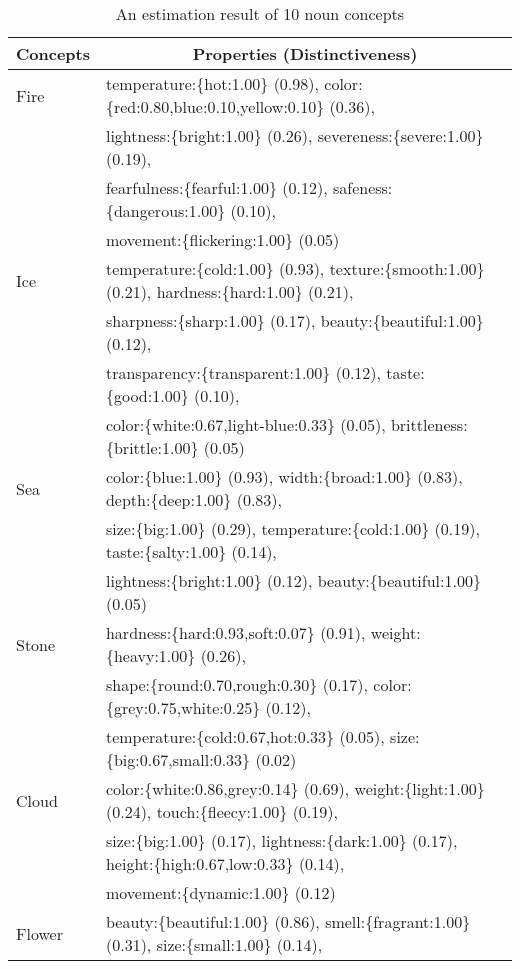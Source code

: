 \begin{table}[t]
  \caption{An estimation result of 10 noun concepts}
  \label{tbl:concepts}
  \footnotesize
  \begin{tabular}{l@{}l} \hline
    Concepts & \multicolumn{1}{c}{Properties (Distinctiveness)}\\ \hline
    Fire & temperature:\{hot:1.00\} (0.98), color:\{red:0.80,blue:0.10,yellow:0.10\} (0.36),\\
    & lightness:\{bright:1.00\} (0.26), severeness:\{severe:1.00\} (0.19),\\
    & fearfulness:\{fearful:1.00\} (0.12), safeness:\{dangerous:1.00\} (0.10),\\
    & movement:\{flickering:1.00\} (0.05)\\
    Ice & temperature:\{cold:1.00\} (0.93), texture:\{smooth:1.00\} (0.21),
    hardness:\{hard:1.00\} (0.21),\\
    & sharpness:\{sharp:1.00\} (0.17), beauty:\{beautiful:1.00\} (0.12), \\
    & transparency:\{transparent:1.00\} (0.12), taste:\{good:1.00\} (0.10), \\
    & color:\{white:0.67,light-blue:0.33\} (0.05), brittleness:\{brittle:1.00\} (0.05) \\
    Sea & color:\{blue:1.00\} (0.93), width:\{broad:1.00\} (0.83), depth:\{deep:1.00\} (0.83), \\
    & size:\{big:1.00\} (0.29), temperature:\{cold:1.00\} (0.19), taste:\{salty:1.00\} (0.14),\\
    & lightness:\{bright:1.00\} (0.12), beauty:\{beautiful:1.00\} (0.05)\\
    Stone & hardness:\{hard:0.93,soft:0.07\} (0.91), weight:\{heavy:1.00\} (0.26), \\
    & shape:\{round:0.70,rough:0.30\} (0.17), color:\{grey:0.75,white:0.25\} (0.12), \\
    & temperature:\{cold:0.67,hot:0.33\} (0.05), size:\{big:0.67,small:0.33\} (0.02)\\
    Cloud & color:\{white:0.86,grey:0.14\} (0.69), weight:\{light:1.00\} (0.24),
    touch:\{fleecy:1.00\} (0.19), \\
    & size:\{big:1.00\} (0.17), lightness:\{dark:1.00\} (0.17), 
    height:\{high:0.67,low:0.33\} (0.14), \\ & movement:\{dynamic:1.00\} (0.12)\\
    Flower & beauty:\{beautiful:1.00\} (0.86), smell:\{fragrant:1.00\} (0.31),
    size:\{small:1.00\} (0.14),\\

\end{tabular}
\end{table}
